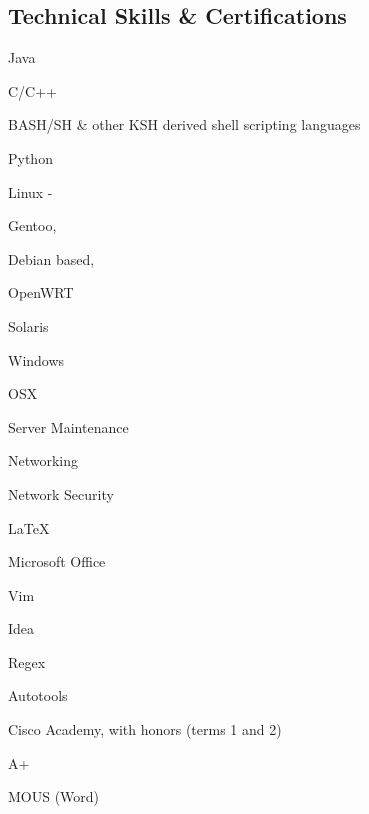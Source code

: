 \documentclass[a4paper,margin,line]{resume}
\begin{document}
\begin{resume}
\section{\mysidestyle Technical Skills \& Certifications}
	\begin{compactdesc}
		\item[Languages] \begin{inparaenum} { \small
			\item Java
			\item C/C++
			\item BASH/SH \& other KSH derived shell scripting languages
			\item Python
		} \end{inparaenum}
		\item[Operating Systems] \begin{inparaenum} { \small
			\item Linux -
			\begin{inparablank}
				\item Gentoo,
				\item Debian based,
				\item OpenWRT
			\end{inparablank}
			\item Solaris
			\item Windows
			\item OSX
		} \end{inparaenum}
		\item[Hardware] \begin{inparaenum} { \small
			\item Server Maintenance
			\item Networking
			\item Network Security
		} \end{inparaenum}
		\item[Tools] \begin{inparaenum} { \small
			\item \LaTeX
			\item Microsoft Office
			\item Vim
			\item Idea
			\item Regex
			\item Autotools
		} \end{inparaenum}
		\item[Certifications] \begin{inparaenum} { \small
			\item Cisco Academy, with honors (terms 1 and 2)
			\item A+
			\item MOUS (Word)
		} \end{inparaenum}
	\end{compactdesc}


\end{resume}
\end{document}
